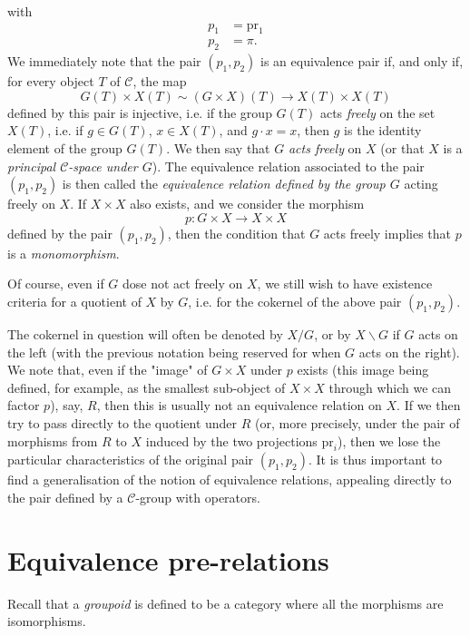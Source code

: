   with
  \[     \begin {aligned}       p_1 &= \mathrm {pr}_1     \\p_2 &= \pi .     \end {aligned}   \]
  We immediately note that the pair \((p_1,p_2)\) is an equivalence pair if, and only if, for every object \(T\) of \(\mathcal {C}\), the map
  \[     G(T)\times  X(T)     \sim  (G\times  X)(T) \to  X(T)\times  X(T)   \]
  defined by this pair is injective, i.e. if the group \(G(T)\) acts \emph{freely} on the set \(X(T)\), i.e. if \(g\in  G(T)\), \(x\in  X(T)\), and \(g\cdot  x=x\), then \(g\) is the identity element of the group \(G(T)\).
  We then say that \(G\) \emph{acts freely} on \(X\) (or that \(X\) is a \emph{principal \(\mathcal {C}\)-space under \(G\)}).
  The equivalence relation associated to the pair \((p_1,p_2)\) is then called the \emph{equivalence relation defined by the group \(G\)} acting freely on \(X\).
  If \(X\times  X\) also exists, and we consider the morphism
  \[     p\colon  G\times  X\to  X\times  X   \]
  defined by the pair \((p_1,p_2)\), then the condition that \(G\) acts freely implies that \(p\) is a \emph{monomorphism}.\par{}Of course, even if \(G\) dose not act freely on \(X\), we still wish to have existence criteria for a quotient of \(X\) by \(G\), i.e. for the cokernel of the above pair \((p_1,p_2)\).\par{}The cokernel in question will often be denoted by \(X/G\), or by \(X\backslash  G\) if \(G\) acts on the left (with the previous notation being reserved for when \(G\) acts on the right).
  We note that, even if the "image" of \(G\times  X\) under \(p\) exists (this image being defined, for example, as the smallest sub-object of \(X\times  X\) through which we can factor \(p\)), say, \(R\), then this is usually not an equivalence relation on \(X\).
  If we then try to pass directly to the quotient under \(R\) (or, more precisely, under the pair of morphisms from \(R\) to \(X\) induced by the two projections \(\mathrm {pr}_i\)), then we lose the particular characteristics of the original pair \((p_1,p_2)\).
  It is thus important to find a generalisation of the notion of equivalence relations, appealing directly to the pair defined by a \(\mathcal {C}\)-group with operators.\chapter{Equivalence pre-relations}\thispagestyle{fancy}\label{fga3.iii-4}\par{}Recall that a \emph{groupoid} is defined to be a category where all the morphisms are isomorphisms.
  
